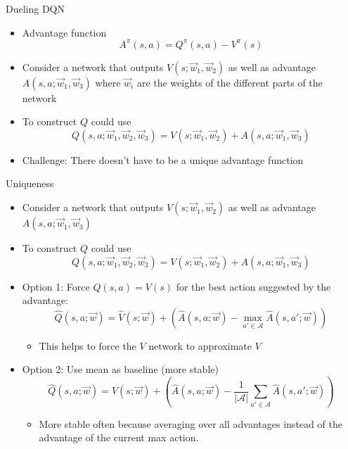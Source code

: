 \documentclass[aspectratio=169]{../latex_main/tntbeamer}  %
\begin{document}
\begin{frame}[c]{Dueling DQN }
	
	\begin{itemize}
	\item Advantage function 
	$$A^\pi (s,a) = Q^\pi(s,a) - V^\pi(s) $$
	\item Consider a network that outputs $V(s; \vec{w}_1, \vec{w}_2)$ as well as advantage $A(s,a; \vec{w}_1, \vec{w}_3)$ where $\vec{w}_i$ are the weights of the different parts of the network
	\item To construct $Q$ could use $$Q(s,a;\vec{w}_1, \vec{w}_2, \vec{w}_3) = V(s;\vec{w}_1, \vec{w}_2) + A(s,a;\vec{w}_1, \vec{w}_3)$$
	\bigskip
	\pause
	\item Challenge: There doesn't have to be a unique advantage function

	\end{itemize}
	
\end{frame}
\begin{frame}[c]{Uniqueness}
	
	\begin{itemize}
		\item Consider a network that outputs $V(s;\vec{w}_1, \vec{w}_2)$ as well as advantage $A(s,a; \vec{w}_1, \vec{w}_3)$
		\item To construct $Q$ could use $$Q(s,a;\vec{w}_1, \vec{w}_2, \vec{w}_3) = V(s;\vec{w}_1, \vec{w}_2) + A(s,a;\vec{w}_1, \vec{w}_3)$$
		\item Option 1: Force $Q(s,a) = V(s)$ for the best action suggested by the advantage:
		$$\hat{Q}(s,a;\vec{w}) = \hat{V}(s;\vec{w}) + \left( \hat{A}(s,a;\vec{w}) - \max_{a' \in \mathcal{A}} \hat{A}(s,a';\vec{w}) \right) $$
		\vspace{-1em}
		\begin{itemize}
			\item This helps to force the $V$ network to approximate $V$
		\end{itemize}
		\item Option 2: Use mean as baseline (more stable)
		$$\hat{Q}(s,a;\vec{w}) = \hat{V}(s;\vec{w}) + \left( \hat{A}(s,a;\vec{w}) - \frac{1}{|\mathcal{A}|} \sum_{a' \in \mathcal{A}} \hat{A}(s,a';\vec{w}) \right) $$
		\vspace{-1em}
		\begin{itemize}
			\item More stable often because averaging over all advantages instead of
			the advantage of the current max action.
		\end{itemize}
	\end{itemize}
	
\end{frame}
\end{document}
